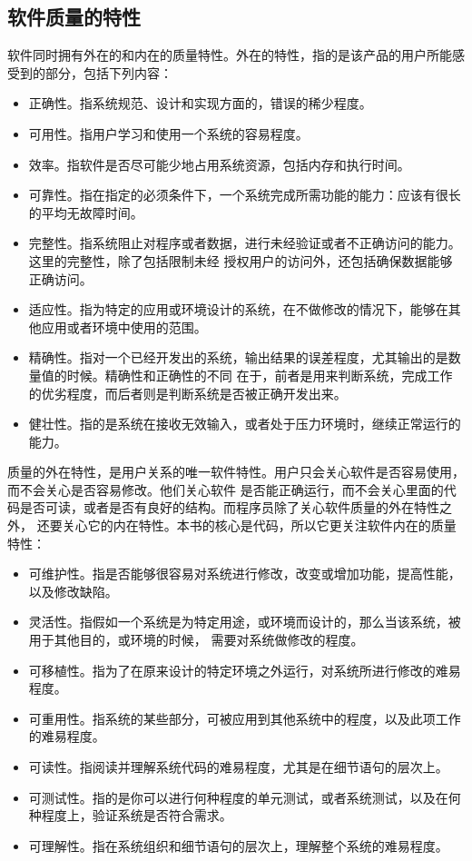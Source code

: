 \documentclass{article}
\begin{document}
\subsection{软件质量的特性}
软件同时拥有外在的和内在的质量特性。外在的特性，指的是该产品的用户所能感受到的部分，包括下列内容：
\begin{itemize}
    \item 正确性。指系统规范、设计和实现方面的，错误的稀少程度。
    \item 可用性。指用户学习和使用一个系统的容易程度。
    \item 效率。指软件是否尽可能少地占用系统资源，包括内存和执行时间。
    \item 可靠性。指在指定的必须条件下，一个系统完成所需功能的能力：应该有很长的平均无故障时间。
    \item 完整性。指系统阻止对程序或者数据，进行未经验证或者不正确访问的能力。这里的完整性，除了包括限制未经
    授权用户的访问外，还包括确保数据能够正确访问。
    \item 适应性。指为特定的应用或环境设计的系统，在不做修改的情况下，能够在其他应用或者环境中使用的范围。
    \item 精确性。指对一个已经开发出的系统，输出结果的误差程度，尤其输出的是数量值的时候。精确性和正确性的不同
    在于，前者是用来判断系统，完成工作的优劣程度，而后者则是判断系统是否被正确开发出来。
    \item 健壮性。指的是系统在接收无效输入，或者处于压力环境时，继续正常运行的能力。
\end{itemize}
质量的外在特性，是用户关系的唯一软件特性。用户只会关心软件是否容易使用，而不会关心是否容易修改。他们关心软件
是否能正确运行，而不会关心里面的代码是否可读，或者是否有良好的结构。而程序员除了关心软件质量的外在特性之外，
还要关心它的内在特性。本书的核心是代码，所以它更关注软件内在的质量特性：
\begin{itemize}
    \item 可维护性。指是否能够很容易对系统进行修改，改变或增加功能，提高性能，以及修改缺陷。
    \item 灵活性。指假如一个系统是为特定用途，或环境而设计的，那么当该系统，被用于其他目的，或环境的时候，
    需要对系统做修改的程度。
    \item 可移植性。指为了在原来设计的特定环境之外运行，对系统所进行修改的难易程度。
    \item 可重用性。指系统的某些部分，可被应用到其他系统中的程度，以及此项工作的难易程度。
    \item 可读性。指阅读并理解系统代码的难易程度，尤其是在细节语句的层次上。
    \item 可测试性。指的是你可以进行何种程度的单元测试，或者系统测试，以及在何种程度上，验证系统是否符合需求。
    \item 可理解性。指在系统组织和细节语句的层次上，理解整个系统的难易程度。
\end{itemize}
\end{document}
